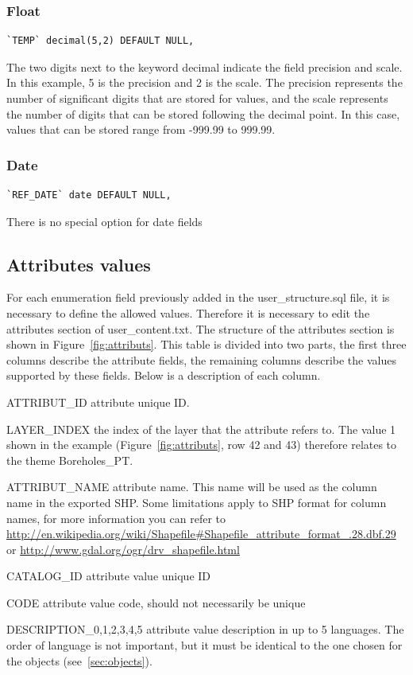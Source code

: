 \documentclass[a4paper, 12pt]{article}
\begin{document}
\subsubsection {Float}

\begin{lstlisting}
`TEMP` decimal(5,2) DEFAULT NULL,
\end{lstlisting}
The two digits next to the keyword decimal indicate the field precision and scale. In this example, 5 is the precision and 2 is the scale. The precision represents the number of significant digits that are stored for values, and the scale represents the number of digits that can be stored following the decimal point. In this case, values that can be stored range from -999.99 to 999.99.
\subsubsection {Date}

\begin{lstlisting}
`REF_DATE` date DEFAULT NULL,
\end{lstlisting}
There is no special option for date fields


\subsection{Attributes values}
\label{sec:attribute-values}
For each enumeration field  previously added in the user\_structure.sql file, it is necessary to define the allowed values. Therefore it is necessary to edit the attributes section of user\_content.txt. The structure of the attributes section is shown in Figure~\ref{fig:attributs}. This table is divided into two parts, the first three columns describe the attribute fields, the remaining columns describe the values supported by these fields. Below is a description of each column.

\begin{description*}
  \item [ATTRIBUT\_ID] attribute unique ID.
  \item [LAYER\_INDEX] the index of the layer that the attribute refers to. The value 1 shown in the example (Figure~\ref{fig:attributs}, row 42 and 43) therefore relates to the theme Boreholes\_PT.
  \item [ATTRIBUT\_NAME] attribute name. This name will be used as the column name in the exported SHP. Some limitations apply to SHP format for column names, for more information you can refer to \url{http://en.wikipedia.org/wiki/Shapefile#Shapefile\_attribute\_format\_.28.dbf.29} or \url{http://www.gdal.org/ogr/drv\_shapefile.html} 
  \item [CATALOG\_ID] attribute value unique ID
  \item [CODE] attribute value code, should not necessarily be unique
  \item [DESCRIPTION\_0,1,2,3,4,5] attribute value description in up to 5 languages. The order of language is not important, but it must be identical to the one chosen for the objects (see~\ref{sec:objects}).

\end{description*}
\end{document}
